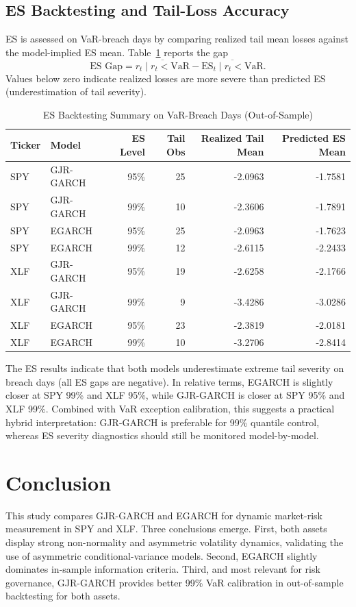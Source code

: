 \documentclass[12pt]{article}
\begin{document}
\subsection{ES Backtesting and Tail-Loss Accuracy}
ES is assessed on VaR-breach days by comparing realized tail mean losses against the model-implied ES mean. Table~\ref{tab:esbt} reports the gap
\begin{equation}
\text{ES Gap} = \overline{r_t\mid r_t<\mathrm{VaR}} - \overline{\mathrm{ES}_t\mid r_t<\mathrm{VaR}}.
\end{equation}
Values below zero indicate realized losses are more severe than predicted ES (underestimation of tail severity).

\begin{table}[htbp]
\centering
\caption{ES Backtesting Summary on VaR-Breach Days (Out-of-Sample)}
\label{tab:esbt}
\begin{tabular}{llrrrr}
\hline
Ticker & Model & ES Level & Tail Obs & Realized Tail Mean & Predicted ES Mean \\
\hline
SPY & GJR-GARCH & 95\% & 25 & -2.0963 & -1.7581 \\
SPY & GJR-GARCH & 99\% & 10 & -2.3606 & -1.7891 \\
SPY & EGARCH & 95\% & 25 & -2.0963 & -1.7623 \\
SPY & EGARCH & 99\% & 12 & -2.6115 & -2.2433 \\
XLF & GJR-GARCH & 95\% & 19 & -2.6258 & -2.1766 \\
XLF & GJR-GARCH & 99\% & 9 & -3.4286 & -3.0286 \\
XLF & EGARCH & 95\% & 23 & -2.3819 & -2.0181 \\
XLF & EGARCH & 99\% & 10 & -3.2706 & -2.8414 \\
\hline
\end{tabular}
\end{table}

The ES results indicate that both models underestimate extreme tail severity on breach days (all ES gaps are negative). In relative terms, EGARCH is slightly closer at SPY 99\% and XLF 95\%, while GJR-GARCH is closer at SPY 95\% and XLF 99\%. Combined with VaR exception calibration, this suggests a practical hybrid interpretation: GJR-GARCH is preferable for 99\% quantile control, whereas ES severity diagnostics should still be monitored model-by-model.

\section{Conclusion}
This study compares GJR-GARCH and EGARCH for dynamic market-risk measurement in SPY and XLF. Three conclusions emerge. First, both assets display strong non-normality and asymmetric volatility dynamics, validating the use of asymmetric conditional-variance models. Second, EGARCH slightly dominates in-sample information criteria. Third, and most relevant for risk governance, GJR-GARCH provides better 99\% VaR calibration in out-of-sample backtesting for both assets.
\end{document}
